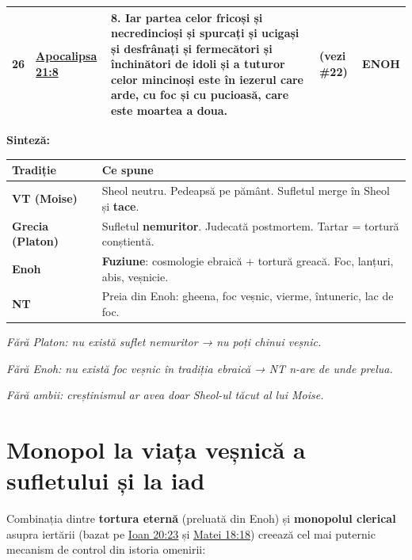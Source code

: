 \documentclass[12pt,a4paper,twoside,openany]{book}
\begin{document}
\begin{longtable}{L{0.7cm}L{0.7cm}L{5.2cm}L{7.1cm}L{0.7cm}}
26 & \href{https://bibliaortodoxa.ro/carte.php?id=4\&cap=21\#8}{\textbf{Apocalipsa 21:8}} & 8. Iar partea celor fricoși și necredincioși și spurcați și ucigași și desfrânați și fermecători și închinători de idoli și a tuturor celor mincinoși este în iezerul care arde, cu foc și cu pucioasă, care este moartea a doua. & (vezi \#22) & \textbf{ENOH} \\
\bottomrule
\end{longtable}
\normalsize
\textbf{Sinteză:}

\begin{center}
\small
\begin{tabular}{L{2.5cm}L{12.6cm}}
\toprule
{}
\textbf{Tradiție} & \textbf{Ce spune} \\
\midrule
\textbf{VT (Moise)} & Sheol neutru. Pedeapsă pe pământ. Sufletul merge în Sheol și \textbf{tace}. \\
\textbf{Grecia (Platon)} & Sufletul \textbf{nemuritor}. Judecată postmortem. Tartar = tortură conștientă. \\
\textbf{Enoh} & \textbf{Fuziune}: cosmologie ebraică + tortură greacă. Foc, lanțuri, abis, veșnicie. \\
\textbf{NT} & Preia din Enoh: gheena, foc veșnic, vierme, întuneric, lac de foc. \\
\bottomrule
\end{tabular}
\end{center}
\normalsize
\textit{Fără Platon: nu există suflet nemuritor → nu poți chinui veșnic. \\}

\textit{Fără Enoh: nu există foc veșnic în tradiția ebraică → NT n-are de unde prelua. \\}

\textit{Fără ambii: creștinismul ar avea doar Sheol-ul tăcut al lui Moise.}


\chapter{Monopol la viața veșnică a sufletului și la iad}\label{monopol}
Combinația dintre \textbf{tortura eternă} (preluată din Enoh) și \textbf{monopolul clerical} asupra iertării (bazat pe \href{https://bibliaortodoxa.ro/carte.php?id=35\&cap=20\#23}{Ioan 20:23} și \href{https://bibliaortodoxa.ro/carte.php?id=55\&cap=18\#18}{Matei 18:18}) creează cel mai puternic mecanism de control din istoria omenirii:
\end{document}
